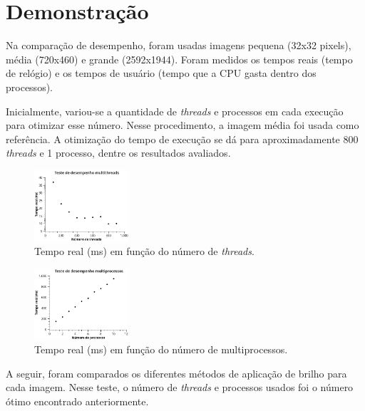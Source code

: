 \documentclass[a4paper, 10pt, conference]{ieeeconf}
\begin{document}
\section{Demonstração}


Na comparação de desempenho, foram usadas imagens pequena (32x32 pixels), média (720x460) e grande (2592x1944). Foram medidos os tempos reais (tempo de relógio) e os tempos de usuário (tempo que a CPU gasta dentro dos processos).

Inicialmente, variou-se a quantidade de \textit{threads} e processos em cada execução para otimizar esse número. Nesse procedimento, a imagem média foi usada como referência. A otimização do tempo de execução se dá para aproximadamente 800 \textit{threads} e 1 processo, dentre os resultados avaliados.

\begin{figure}[h]
	\centering
	\includegraphics[width=3.5cm]{Figuras/multithreads}
	\caption{Tempo real (ms) em função do número de \textit{threads}.}
\end{figure}

\begin{figure}[h]
	\centering
	\includegraphics[width=3.5cm]{Figuras/multiprocessos}
	\caption{Tempo real (ms) em função do número de multiprocessos.}
\end{figure}

A seguir, foram comparados os diferentes métodos de aplicação de brilho para cada imagem. Nesse teste, o número de \textit{threads} e processos usados foi o número ótimo encontrado anteriormente.
\end{document}

